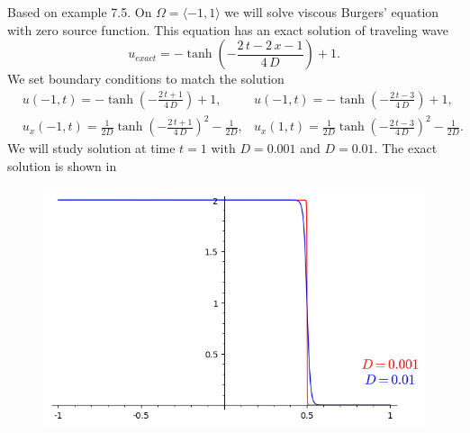 \begin{example}
\label{ex:burgers_hest}
Based on \cite[Section 7.1.2, Example 7.5,  p. 255]{Hesthaven2008} example 7.5.
On $\Omega = \langle -1, 1 \rangle$ we will solve viscous Burgers’ equation with zero 
source function.
This equation has an exact solution of traveling wave 
\begin{equation}
	u_{exact} =  -\tanh\left(-\frac{2 \, t - 2 \, x - 1}{4 \,D}\right) + 1.
\end{equation}
We set boundary conditions to match the solution
\begin{equation}
	\begin{aligned}
	& u(-1, t) = -\tanh\left(-\frac{2 \, t  + 1}{4 \,D}\right) + 1, 
	&  u(-1, t) = -\tanh\left(-\frac{2 \, t - 3}{4 \,D}\right) + 1,\\
	&u_x(-1, t) = \frac{1}{2D}\tanh\left(-\frac{2 \, t + 1}{4 \, D}\right)^{2} - 
	\frac{1}{2D}, 
	&u_x(1, t) = \frac{1}{2D}\tanh\left(-\frac{2 \, t - 3}{4 \, D}\right)^{2} - 
	\frac{1}{2D}.
	\end{aligned}
\end{equation}
We will study solution at time $t = 1$ with $D = 0.001$ and $D = 0.01$. The exact 
solution is shown in 
\begin{figure}[h]
	\centering
%	
	\includegraphics[scale=0.5]{../figs/burgers_hesthaven_exact_t1.png}

\end{figure}
\end{example}
